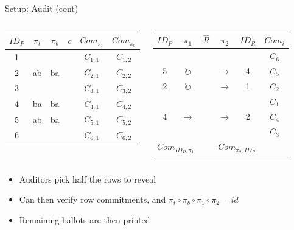 \documentclass{beamer}
\begin{document}
\begin{frame}{Setup: Audit (cont)}
	\begingroup
	\fontsize{8pt}{10pt}\selectfont
	\begin{columns}
		\begin{center}
			\begin{tabular}{|c|c|c|c|c|c|}
				\hline
				$ID_P$ & $\pi_{t}$ & $\pi_{b}$ & $c$ & $Com_{\pi_{t}}$ & $Com_{\pi_{b}}$ \\
				\hline
				1 & & & & $C_{1, 1}$ & $C_{1, 2}$ \\
				2 & ab & ba & & $C_{2, 1}$ & $C_{2, 2}$ \\
				3 & & & & $C_{3, 1}$ & $C_{3, 2}$ \\
				4 & ba & ba & & $C_{4, 1}$ & $C_{4, 2}$ \\
				5 & ab & ba & & $C_{5, 1}$ & $C_{5, 2}$ \\
				6 & & & & $C_{6, 1}$ & $C_{6, 2}$ \\
				\hline
			\end{tabular}
		\end{center}

		\begin{center}
			\begin{tabular}{|c|c|c|c|c|c|}
				\hline
				$ID_P$ & $\pi_1$ & $\hat{R}$ & $\pi_2$ & $ID_R$ & $Com_{i}$ \\
				\hline
				  &                     & &                     &   & $C_6$ \\
				5 & $\circlearrowright$ & & $\rightarrow$       & 4 & $C_5$ \\
				2 & $\circlearrowright$ & & $\rightarrow$       & 1 & $C_2$ \\
				  &                     & &                     &   & $C_1$ \\
				4 & $\rightarrow$       & & $\rightarrow$       & 2 & $C_4$ \\
				  &                     & &                     &   & $C_3$ \\
				\hline
				\multicolumn{2}{|c|}{$Com_{ID_P, \pi_1}$} &   & \multicolumn{2}{c|}{$Com_{\pi_2, ID_R}$} & \\
				\hline
			\end{tabular}
		\end{center}
	\end{columns}
	\endgroup

	\begin{itemize}
		\item Auditors pick half the rows to reveal
		\item Can then verify row commitments, and $\pi_t \circ \pi_b
			\circ \pi_1 \circ \pi_2 = id$
		\item Remaining ballots are then printed
	\end{itemize}
\end{frame}
\end{document}
